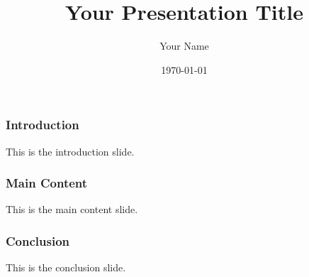 \documentclass{beamer}
\title{Your Presentation Title}
\author{Your Name}
\institute{Your Institution}
\date{\today}
\begin{document}
\begin{frame}
    \titlepage
\end{frame}

\begin{frame}
    \frametitle{Introduction}
    This is the introduction slide.
\end{frame}

\begin{frame}
    \frametitle{Main Content}
    This is the main content slide.
\end{frame}

\begin{frame}
    \frametitle{Conclusion}
    This is the conclusion slide.
\end{frame}

\end{document}
